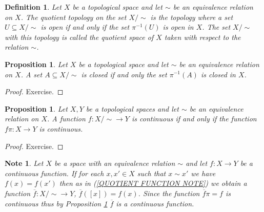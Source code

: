 \documentclass[11pt, letterpaper, oneside]{report}
\theoremstyle{pplain}
\newtheorem{proposition}[theorem]{Proposition}
\newtheorem{ITERMVALUE THM}[theorem]{Intermediate Value Theorem}
\newtheorem{HEINEBOREL THM}[theorem]{Heine-Borel Theorem}
\newtheorem{UMETR THM}[theorem]{Urysohn Metrization Theorem}
\newtheorem{UMETR2 THM}[theorem]{Urysohn Metrization Theorem (v.2)}
\theoremstyle{ddefinition}
\newtheorem{definition}[theorem]{Definition}
\newtheorem{note}[theorem]{Note}
\theoremstyle{nnn}
\newtheorem{TDA NN}[theorem]{Topological Data Analysis. }
\theoremstyle{eexercise}
\begin{document}
\begin{definition}
Let $X$ be a topological space and let $\sim$ be an equivalence relation on  $X$. 
The \emph{quotient topology} on the set $X/{\sim}$ is the topology where a set $U\subseteq X/{\sim}$ 
is open  if and only if the set $\pi^{-1}(U)$ is open in $X$. The set $X/{\sim}$ with this topology is called the
 \emph{quotient space} of $X$ taken with respect to the relation $\sim$. 
\end{definition}

\begin{proposition}
\label{CLOSED SET QUOTIENT TOP PROP}
Let $X$ be a topological space and let $\sim$ be an equivalence relation on  $X$. A set $A\subseteq X/{\sim}$
is closed if and only  the set $\pi^{-1}(A)$ is closed in $X$. 
\end{proposition}

\begin{proof}
Exercise.
\end{proof}

\begin{proposition}
\label{QUOTIENT SPACE FUNCTIONS PROP}
Let $X, Y$ be a topological spaces  and let $\sim$ be an equivalence 
relation on $X$. A function $f\colon X/{\sim}\to Y$ is continuous if and only if the function $f\pi\colon X \to Y$ is 
continuous. 
\end{proposition}

\begin{proof}
Exercise. 
\end{proof}

\begin{note}
\label{QUOTIENT SPACE FACTORIZATION NOTE}
Let $X$ be a space with an equivalence relation $\sim$ and let $f\colon X \to Y$ be a continuous function. 
If for each $x, x'\in X$ such that $x\sim x'$ we have $f(x) = f(x')$ then as in 
(\ref{QUOTIENT FUNCTION NOTE}) we obtain a function $\overline{f}\colon X/{\sim} \to Y$, 
$\overline{f}([x]) = f(x)$. Since the function $\overline{f}\pi = f$ is continuous thus by 
Proposition \ref{QUOTIENT SPACE FUNCTIONS PROP} $\overline{f}$ is a continuous function. 
\end{note}
\end{document}
